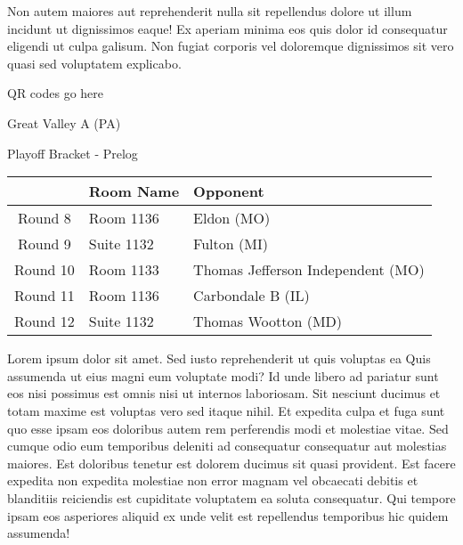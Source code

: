 \documentclass{article}%
\begin{document}
\newline%
Non autem maiores aut reprehenderit nulla sit repellendus dolore ut illum incidunt ut dignissimos eaque! Ex aperiam minima eos quis dolor id consequatur eligendi ut culpa galisum. Non fugiat corporis vel doloremque dignissimos sit vero quasi sed voluptatem explicabo.\newline%
\newline%
%
\vspace*{30pt}%
\begin{center}%
\begin{Huge}%
QR codes go here%
\end{Huge}%
\end{center}%
\newpage%
\begin{center}%
\begin{Huge}%
Great Valley A (PA)%
\end{Huge}%
\vspace*{8pt}%
\linebreak%
\begin{Large}%
Playoff Bracket {-} Prelog%
\end{Large}%
\end{center}%
\begin{tabularx}{\textwidth}{|c|Y|Y|}%
\hline%
&Room Name&Opponent\\%
\hline%
Round 8&Room 1136&Eldon (MO)\\%
Round 9&Suite 1132&Fulton (MI)\\%
Round 10&Room 1133&Thomas Jefferson Independent (MO)\\%
Round 11&Room 1136&Carbondale B (IL)\\%
Round 12&Suite 1132&Thomas Wootton (MD)\\%
\hline%
\end{tabularx}%
\vspace*{8pt}%
\linebreak%
\newline%
\newline%
Lorem ipsum dolor sit amet. Sed iusto reprehenderit ut quis voluptas ea Quis assumenda ut eius magni eum voluptate modi? Id unde libero ad pariatur sunt eos nisi possimus est omnis nisi ut internos laboriosam. Sit nesciunt ducimus et totam maxime est voluptas vero sed itaque nihil. Et expedita culpa et fuga sunt quo esse ipsam eos doloribus autem rem perferendis modi et molestiae vitae.\newline%
\newline%
Sed cumque odio eum temporibus deleniti ad consequatur consequatur aut molestias maiores. Est doloribus tenetur est dolorem ducimus sit quasi provident. Est facere expedita non expedita molestiae non error magnam vel obcaecati debitis et blanditiis reiciendis est cupiditate voluptatem ea soluta consequatur. Qui tempore ipsam eos asperiores aliquid ex unde velit est repellendus temporibus hic quidem assumenda!\newline%
\end{document}
